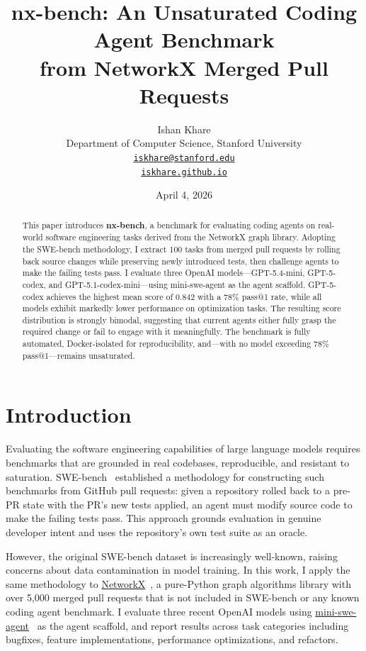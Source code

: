 \documentclass[10pt]{article}
\title{\textbf{nx-bench}: An Unsaturated Coding Agent Benchmark\\from NetworkX Merged Pull Requests}
\author{Ishan Khare\\
Department of Computer Science, Stanford University\\
\href{mailto:iskhare@stanford.edu}{\texttt{iskhare@stanford.edu}}\\
\href{https://iskhare.github.io}{\texttt{iskhare.github.io}}}
\date{April 4, 2026}
\begin{document}
\maketitle

\begin{abstract}
This paper introduces \textbf{nx-bench}, a benchmark for evaluating coding agents on real-world software engineering tasks derived from the NetworkX graph library. Adopting the SWE-bench methodology, I extract 100 tasks from merged pull requests by rolling back source changes while preserving newly introduced tests, then challenge agents to make the failing tests pass. I evaluate three OpenAI models---GPT-5.4-mini, GPT-5-codex, and GPT-5.1-codex-mini---using mini-swe-agent as the agent scaffold. GPT-5-codex achieves the highest mean score of 0.842 with a 78\% pass@1 rate, while all models exhibit markedly lower performance on optimization tasks. The resulting score distribution is strongly bimodal, suggesting that current agents either fully grasp the required change or fail to engage with it meaningfully. The benchmark is fully automated, Docker-isolated for reproducibility, and---with no model exceeding 78\% pass@1---remains unsaturated.
\end{abstract}

\section{Introduction}

Evaluating the software engineering capabilities of large language models requires benchmarks that are grounded in real codebases, reproducible, and resistant to saturation. SWE-bench~\cite{swebench} established a methodology for constructing such benchmarks from GitHub pull requests: given a repository rolled back to a pre-PR state with the PR's new tests applied, an agent must modify source code to make the failing tests pass. This approach grounds evaluation in genuine developer intent and uses the repository's own test suite as an oracle.

However, the original SWE-bench dataset is increasingly well-known, raising concerns about data contamination in model training. In this work, I apply the same methodology to \href{https://github.com/networkx/networkx}{NetworkX}~\cite{networkx}, a pure-Python graph algorithms library with over 5,000 merged pull requests that is not included in SWE-bench or any known coding agent benchmark. I evaluate three recent OpenAI models using \href{https://github.com/SWE-agent/mini-swe-agent}{mini-swe-agent}~\cite{minisweagent} as the agent scaffold, and report results across task categories including bugfixes, feature implementations, performance optimizations, and refactors.
\end{document}

